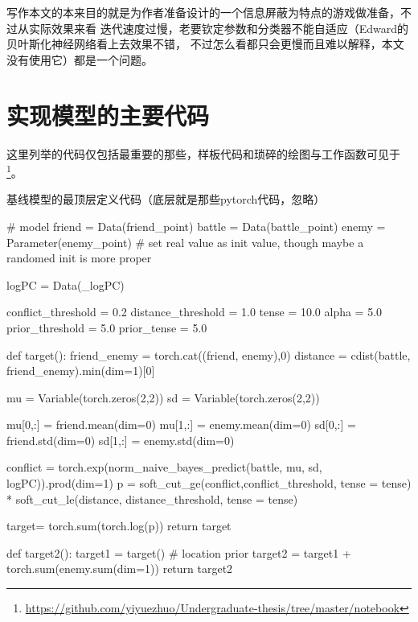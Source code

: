 \documentclass{article}
\begin{document}
写作本文的本来目的就是为作者准备设计的一个信息屏蔽为特点的游戏做准备，不过从实际效果来看
迭代速度过慢，老要钦定参数和分类器不能自适应（Edward的贝叶斯化神经网络看上去效果不错，
不过怎么看都只会更慢而且难以解释，本文没有使用它）都是一个问题。


\section{实现模型的主要代码}

这里列举的代码仅包括最重要的那些，样板代码和琐碎的绘图与工作函数可见于
\footnote{\url{https://github.com/yiyuezhuo/Undergraduate-thesis/tree/master/notebook}}。



基线模型的最顶层定义代码（底层就是那些pytorch代码，忽略）

\begin{python}

# model
friend = Data(friend_point)
battle = Data(battle_point)
enemy = Parameter(enemy_point) # set real value as init value, though maybe a randomed init is more proper

logPC = Data(_logPC)

conflict_threshold = 0.2
distance_threshold = 1.0
tense = 10.0
alpha = 5.0
prior_threshold = 5.0
prior_tense = 5.0

def target():
    friend_enemy = torch.cat((friend, enemy),0)
    distance = cdist(battle, friend_enemy).min(dim=1)[0]
    

    mu = Variable(torch.zeros(2,2)) 
    sd = Variable(torch.zeros(2,2))
    
    mu[0,:] = friend.mean(dim=0)
    mu[1,:] = enemy.mean(dim=0)
    sd[0,:] = friend.std(dim=0)
    sd[1,:] = enemy.std(dim=0)
    
    conflict = torch.exp(norm_naive_bayes_predict(battle, mu, sd, logPC)).prod(dim=1)
    p = soft_cut_ge(conflict,conflict_threshold, tense = tense) * soft_cut_le(distance, distance_threshold, tense = tense)
    
    target= torch.sum(torch.log(p))
    return target

def target2():
    target1 = target()
    # location prior
    target2 = target1 + torch.sum(enemy.sum(dim=1))
    return target2

\end{python}
\end{document}
